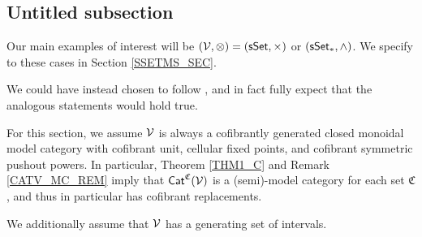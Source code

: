 \documentclass[a4paper,10pt
,draft
]{article}%
\renewcommand{\1}{\eta}%
\begin{document}












\subsection{Untitled subsection}


Our main examples of interest will be $(\mathcal V, \otimes) = (\mathsf{sSet}, \times)$ or $(\sSet_{\**}, \wedge)$.
We specify to these cases in Section \ref{SSETMS_SEC}.





\begin{remark}
      We could have instead chosen to follow \cite{Mur15}, and in fact
      fully expect that the analogous statements would hold true.
\end{remark}

\begin{convention}
      \label{ALLCOLOR_CONV}
      For this section, we assume $\mathcal V$ is always a cofibrantly generated closed monoidal model category with
      cofibrant unit, cellular fixed points, and cofibrant symmetric pushout powers.
      In particular, Theorem \ref{THM1_C} and Remark \ref{CATV_MC_REM} imply that $\mathsf{Cat}^{\mathfrak C}(\mathcal V)$ is a (semi)-model category for each set $\mathfrak C$,
      and thus in particular has cofibrant replacements.

      We additionally assume that $\mathcal V$ has a generating set of intervals.
\end{convention}
\end{document}
